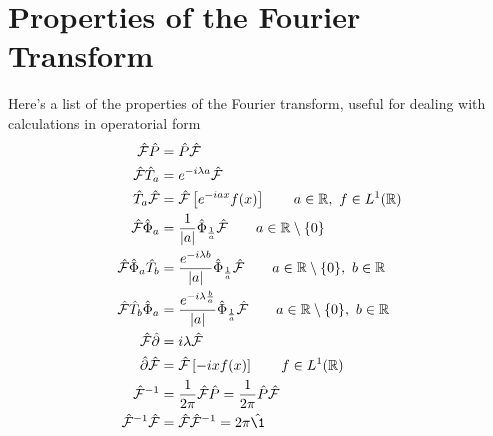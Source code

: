 \documentclass[../complete.tex]{subfiles}
\begin{document}
\section{Properties of the Fourier Transform}
Here's a list of the properties of the Fourier transform, useful for dealing with calculations in operatorial form
\begin{equation}
	\begin{aligned}
		\fou\opr{P}&=\opr{P}\fou\\
		\fou\opr{T}_a&=e^{-i\lambda a}\fou\\
		\opr{T}_a\fou&=\fou\left[ e^{-iax}f(x) \right]\qquad a\in\R,\ f\in L^1(\R)\\
		\fou\opr{\Phi}_a&=\frac{1}{\abs{a}}\opr{\Phi}_{\frac{1}{a}}\fou\qquad a\in\R\setminus\{0\}\\
		\fou\opr{\Phi}_a\opr{T}_b&=\frac{e^{-i\lambda b}}{\abs{a}}\opr{\Phi}_{\frac{1}{a}}\fou\qquad a\in\R\setminus\{0\},\ b\in\R\\
		\fou\opr{T}_b\opr{\Phi}_a&=\frac{e^{-i\lambda\frac{b}{a}}}{\abs{a}}\opr{\Phi}_{\frac{1}{a}}\fou\qquad a\in\R\setminus\{0\},\ b\in\R\\
		\fou\opr{\del}&=i\lambda\fou\\
		\opr{\del}\fou&=\fou\left[ -ixf(x) \right]\qquad f\in L^1(\R)\\
		\fou^{-1}&=\frac{1}{2\pi}\fou\opr{P}=\frac{1}{2\pi}\opr{P}\fou\\
		\fou^{-1}\fou&=\fou\fou^{-1}=2\pi\opr{\1}
	\end{aligned}
	\label{eq:fouriertranspropcomp}
\end{equation}
\end{document}
